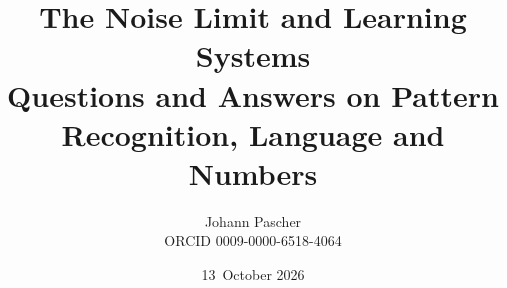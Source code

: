 \documentclass[11pt,a4paper]{report}
\title{The Noise Limit and Learning Systems\\[0.5em]
  \large Questions and Answers on Pattern Recognition, Language and Numbers}
\date{13~October 2026}
\author{Johann Pascher\\\small ORCID 0009-0000-6518-4064}
\begin{document}
\renewcommand{\thechapter}{}
\renewcommand{\thesection}{\arabic{section}}
\maketitle
\tableofcontents

\end{document}

